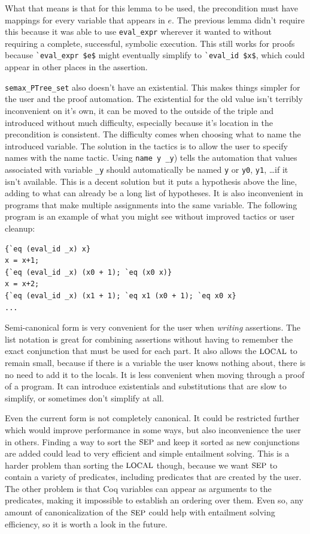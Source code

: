 \documentclass{puthesis}
\begin{document}
What that means is that for this lemma to be used, the precondition
must have mappings for every variable that appears in $e$. The
previous lemma didn't require this because it was able to use
\lstinline|eval_expr| wherever it wanted to without requiring a
complete, successful, symbolic execution. This still works for proofs
because \lstinline|`eval_expr $e$| might eventually simplify to
\lstinline|`eval_id $x$|, which could appear in other places in the
assertion.

\lstinline|semax_PTree_set| also doesn't have an existential. This
makes things simpler for the user and the proof automation. The
existential for the old value isn't terribly inconvenient on it's own,
it can be moved to the outside of the triple and introduced without
much difficulty, especially because it's location in the precondition
is consistent. The difficulty comes when choosing what to name the
introduced variable. The solution in the tactics is to allow the user
to specify names with the name tactic. Using \lstinline|name y _y|)
tells the automation that values associated with variable
\lstinline|_y| should automatically be named \lstinline|y| or
\lstinline|y0|, \lstinline|y1|, \ldots if it isn't available.  This is
a decent solution but it puts a hypothesis above the line, adding to
what can already be a long list of hypotheses. It is also inconvenient
in programs that make multiple assignments into the same variable. The
following program is an example of what you might see without improved
tactics or user cleanup:

\begin{lstlisting}
{`eq (eval_id _x) x}
x = x+1;
{`eq (eval_id _x) (x0 + 1); `eq (x0 x)}
x = x+2;
{`eq (eval_id _x) (x1 + 1); `eq x1 (x0 + 1); `eq x0 x}
...
\end{lstlisting}



Semi-canonical form is very convenient for the user when
\emph{writing} assertions. The list notation is great for combining
assertions without having to remember the exact conjunction that must
be used for each part. It also allows the $\mbox{\small LOCAL}$ to remain small,
because if there is a variable the user knows nothing about, there is
no need to add it to the locals. It is less convenient when moving
through a proof of a program. It can introduce existentials and
substitutions that are slow to simplify, or sometimes don't simplify
at all.

Even the current form is not completely canonical. It could be
restricted further which would improve performance in some ways, but
also inconvenience the user in others. Finding a way to sort the
$\mbox{\small SEP}$ and keep it sorted as new conjunctions are added could lead to
very efficient and simple entailment solving. This is a harder problem
than sorting the $\mbox{\small LOCAL}$ though, because we want $\mbox{\small SEP}$ to contain a
variety of predicates, including predicates that are created by the
user. The other problem is that Coq variables can appear as arguments
to the predicates, making it impossible to establish an ordering over
them. Even so, any amount of canonicalization of the $\mbox{\small SEP}$ could help
with entailment solving efficiency, so it is worth a look in the
future.
\end{document}
